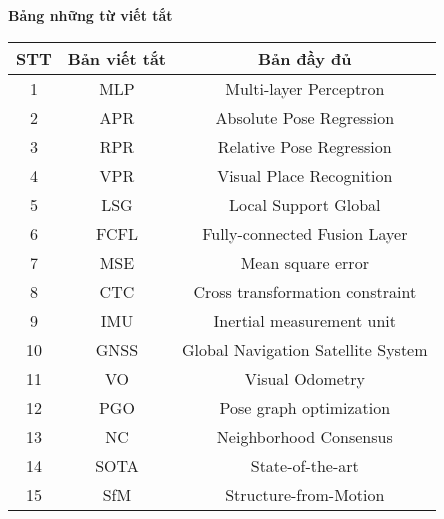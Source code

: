 \titlepage \null
	\small
	\begin{center}
	  {\bfseries Bảng những từ viết tắt\vspace{-.5em}}
	\end{center}
	\quotation
\begin{table}[h]
\centering
\begin{tabular}{|c|c|c|}
\hline
\textbf{STT} & \textbf{Bản viết tắt}                & \textbf{Bản đầy đủ}     \\ \hline
1            & MLP                  & Multi-layer Perceptron        \\ \hline
2            & APR                  & Absolute Pose Regression      \\ \hline
3            & RPR                  & Relative Pose Regression      \\ \hline
4            & VPR                  & Visual Place Recognition      \\ \hline
5            & LSG                  & Local Support Global          \\ \hline
6            & FCFL                 & Fully-connected Fusion Layer  \\ \hline
7            & MSE                  & Mean square error             \\ \hline
8            & CTC                  & Cross transformation constraint \\ \hline
9		& IMU		& Inertial measurement unit	\\ \hline
10		& GNSS		& Global Navigation Satellite System \\ \hline
11		& VO			& Visual Odometry	\\ \hline
12      & PGO       & Pose graph optimization   \\ \hline
13	 & NC 	 & Neighborhood Consensus	\\ \hline
14 		& SOTA		& State-of-the-art \\ \hline
15		& SfM 		& Structure-from-Motion
\end{tabular}
\end{table}

